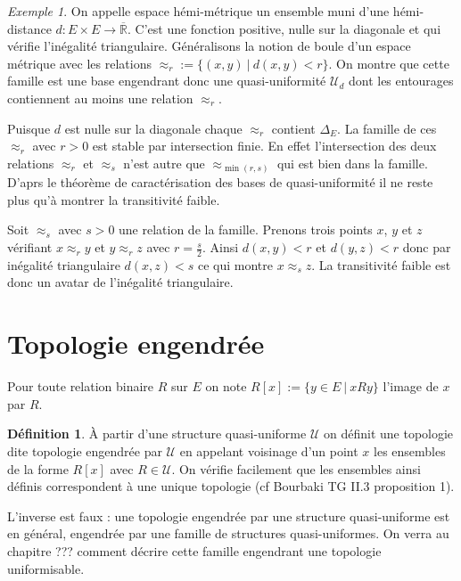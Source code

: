 \documentclass[a4paper, 11pt, french]{book}
\let\colour=\color
\theoremstyle{plain} %
\theoremstyle{definition} %
\newtheorem{definition}{Définition}
\theoremstyle{remark} %
\newtheorem{exemple}{Exemple}
\newcommand{\1}{\mathds{1}}
\newcommand{\R}{\mathbb{R}}
\newcommand{\scr}[1]{\mathscr{#1}}
\newcommand\ens[2]{\{#1 \ |\ #2\}}
\begin{document}
\begin{exemple}
	On appelle espace hémi-métrique un ensemble muni d'une hémi-distance $d\colon E\times E\rightarrow\overline{\R}$.
	C'est une fonction positive, nulle sur la diagonale et qui vérifie l'inégalité triangulaire.
	Généralisons la notion de boule d'un espace métrique avec les relations $\approx_r :=\ens{(x, y)}{d(x, y)<r}$.
	On montre que cette famille est une base engendrant donc une quasi-uniformité $\scr{U}_d$ dont les entourages contiennent au moins une relation $\approx_r$.

	Puisque $d$ est nulle sur la diagonale chaque $\approx_r$ contient $\Delta_E$.
	La famille de ces $\approx_r$ avec $r>0$ est stable par intersection finie.
	En effet l'intersection des deux relations $\approx_r$ et $\approx_s$ n'est autre que $\approx_{\min(r, s)}$ qui est bien dans la famille.
	D'aprs le théorème de caractérisation des bases de quasi-uniformité il ne reste plus qu'à montrer la transitivité faible.

	Soit $\approx_s$ avec $s>0$ une relation de la famille.
	Prenons trois points $x$, $y$ et $z$ vérifiant $x\approx_ry$ et $y\approx_rz$ avec $r=\frac{s}{2}$.
	Ainsi $d(x, y)<r$ et $d(y, z)<r$ donc par inégalité triangulaire $d(x,z)<s$ ce qui montre $x\approx_s z$.
	La transitivité faible est donc un avatar de l'inégalité triangulaire.
\end{exemple}

\section{Topologie engendrée}

Pour toute relation binaire $R$ sur $E$ on note $R[x]:=\ens{y\in E}{xRy}$ l'image de $x$ par $R$.

\begin{definition}
	À partir d'une structure quasi-uniforme $\mathscr{U}$ on définit une topologie dite topologie engendrée par $\mathscr{U}$ en appelant voisinage d'un point $x$ les ensembles de la forme $R[x]$ avec $R\in\mathscr{U}$.
	On vérifie facilement que les ensembles ainsi définis correspondent à une unique topologie (cf Bourbaki TG II.3 proposition 1).
\end{definition}

L'inverse est faux : une topologie engendrée par une structure quasi-uniforme est en général, engendrée par une famille de structures quasi-uniformes.
On verra au chapitre {\colour{red} ???} comment décrire cette famille engendrant une topologie uniformisable.
\end{document}
